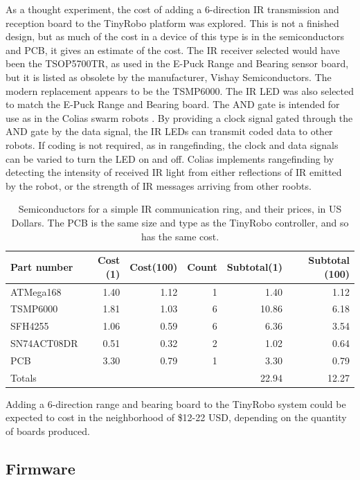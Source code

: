 As a thought experiment, the cost of adding a 6-direction IR transmission and reception board to the TinyRobo platform was explored. 
This is not a finished design, but as much of the cost in a device of this type is in the semiconductors and PCB, it gives an estimate of the cost. 
The IR receiver selected would have been the TSOP5700TR, as used in the E-Puck Range and Bearing sensor board, but it is listed as obsolete by the manufacturer, Vishay Semiconductors. 
The modern replacement appears to be the TSMP6000.
The IR LED was also selected to match the E-Puck Range and Bearing board.
The AND gate is intended for use as in the Colias swarm robots \citep{arvin2009development}.
By providing a clock signal gated through the AND gate by the data signal, the IR LEDs can transmit coded data to other robots. 
If coding is not required, as in rangefinding, the clock and data signals can be varied to turn the LED on and off. 
Colias implements rangefinding by detecting the intensity of received IR light from either reflections of IR emitted by the robot, or the strength of IR messages arriving from other roobts. 

\begin{table}
	\begin{tabular}{l r r r r r }
		Part number & Cost (1) & Cost(100) & Count & Subtotal(1) & Subtotal (100)\\
		\hline 
		ATMega168 & 1.40 & 1.12 & 1 & 1.40 & 1.12  \\
		TSMP6000 & 1.81 & 1.03 & 6 & 10.86 & 6.18  \\
		SFH4255  & 1.06 & 0.59 & 6 & 6.36 & 3.54 \\
		SN74ACT08DR & 0.51 & 0.32 & 2 & 1.02 & 0.64 \\
		PCB & 3.30 & 0.79 & 1 & 3.30 & 0.79\\
		\hline 
		Totals & & & & 22.94 & 12.27\\
	\end{tabular}
	\caption{Semiconductors for a simple IR communication ring, and their prices, in US Dollars. The PCB is the same size and type as the TinyRobo controller, and so has the same cost.}
	\label{tab:ir_ranger_board}
\end{table}

Adding a 6-direction range and bearing board to the TinyRobo system could be expected to cost in the neighborhood of \$12-22 USD, depending on the quantity of boards produced. 

\subsection {Firmware}

